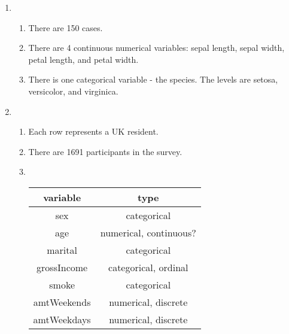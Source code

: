 \documentclass[12pt,letterpaper]{article}
\begin{document}
\begin{enumerate}
\item
\begin{enumerate}
\item There are 150 cases.
\item There are 4 continuous numerical variables: sepal length, sepal width, petal length, and petal width.
\item There is one categorical variable - the species. The levels are setosa, versicolor, and virginica.
\end{enumerate}

\item
\begin{enumerate}
\item Each row represents a UK resident.
\item There are 1691 participants in the survey.
\item ~\\
\begin{tabular}{|c|c|}\hline
variable & type \\ \hline
sex & categorical \\
age & numerical, continuous? \\
marital & categorical \\
grossIncome & categorical, ordinal \\
smoke & categorical \\
amtWeekends & numerical, discrete \\
amtWeekdays & numerical, discrete \\ \hline
\end{tabular}
\end{enumerate}



\end{enumerate}
\end{document}
